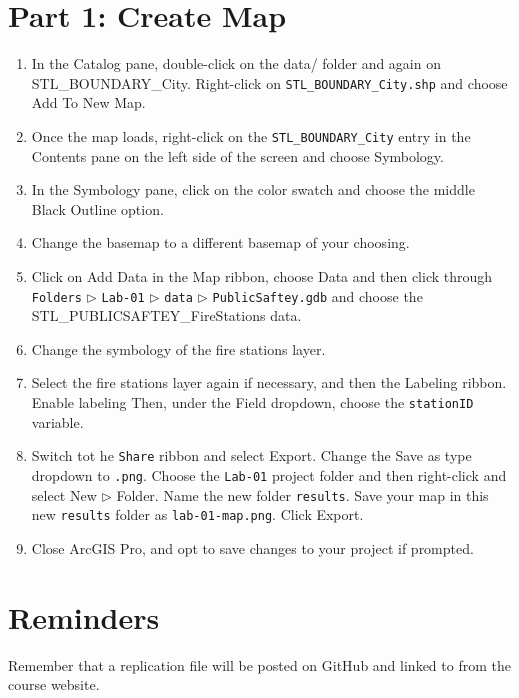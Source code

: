 \documentclass{tufte-handout}
\begin{document}
\vspace{5mm}
\section{Part 1: Create Map}
\begin{enumerate}
\item In the \textsf{Catalog} pane, \textsf{double-click} on the \textsf{data/} folder and again on \textsf{STL\_BOUNDARY\_City}. \textsf{Right-click} on \texttt{STL\_BOUNDARY\_City.shp} and choose \textsf{Add To New Map}.
\item Once the map loads, \textsf{right-click} on the \texttt{STL\_BOUNDARY\_City} entry in the \textsf{Contents} pane on the left side of the screen and choose \textsf{Symbology}. 
\item In the \textsf{Symbology} pane, \textsf{click} on the color swatch and choose the middle \textsf{Black Outline} option.
\item Change the basemap to a different basemap of your choosing.
\item Click on \textsf{Add Data} in the \textsf{Map} ribbon, choose \textsf{Data} and then click through \texttt{Folders} $\triangleright$ \texttt{Lab-01} $\triangleright$ \texttt{data} $\triangleright$ \texttt{PublicSaftey.gdb} and choose the \textsf{STL\_PUBLICSAFTEY\_FireStations} data.
\item Change the symbology of the fire stations layer.
\item Select the fire stations layer again if necessary, and then the \textsf{Labeling} ribbon. Enable labeling Then, under the \textsf{Field} dropdown, choose the \texttt{stationID} variable. 
\item Switch tot he \texttt{Share} ribbon and select \textsf{Export}. Change the \textsf{Save as type} dropdown to \texttt{.png}. Choose the \texttt{Lab-01} project folder and then \textsf{right-click} and select \textsf{New} $\triangleright$ \textsf{Folder}. Name the new folder \texttt{results}. Save your map in this new \texttt{results} folder as \texttt{lab-01-map.png}. Click \textsf{Export}.
\item Close ArcGIS Pro, and opt to save changes to your project if prompted.
\end{enumerate}

\vspace{5mm}
\section{Reminders}
Remember that a replication file will be posted on GitHub and linked to from the course website.

\end{document}
